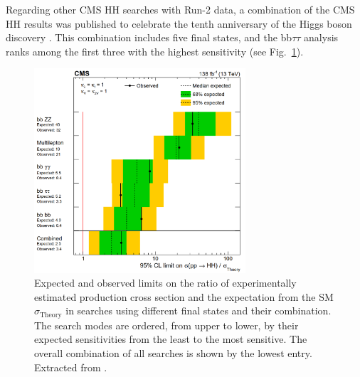 \documentclass[../main.tex]{subfiles}
\begin{document}
Regarding other CMS HH searches with Run-2 data, a combination of the CMS HH results was published to celebrate the tenth anniversary of the Higgs boson discovery \cite{hh:analysis:nature}. This combination includes five final states, and the bb$\tau\tau$ analysis ranks among the first three with the highest sensitivity (see Fig.~\ref{hh:fig:lim_comb}). 


\begin{figure}
\begin{center}
\includegraphics[width=0.7\textwidth]{Images/CMS-HIG-22-001_Figure_005-a}
\end{center}
\caption{Expected and observed limits on the ratio of experimentally estimated production cross section and the expectation from the SM $\sigma_{\text{Theory}}$ in searches using different final states and their combination. The search modes are ordered, from upper to lower, by their expected sensitivities from the least to the most sensitive. The overall combination of all searches is shown by the lowest entry. Extracted from \cite{hh:analysis:nature}.}
\label{hh:fig:lim_comb}
\end{figure}
\end{document}
